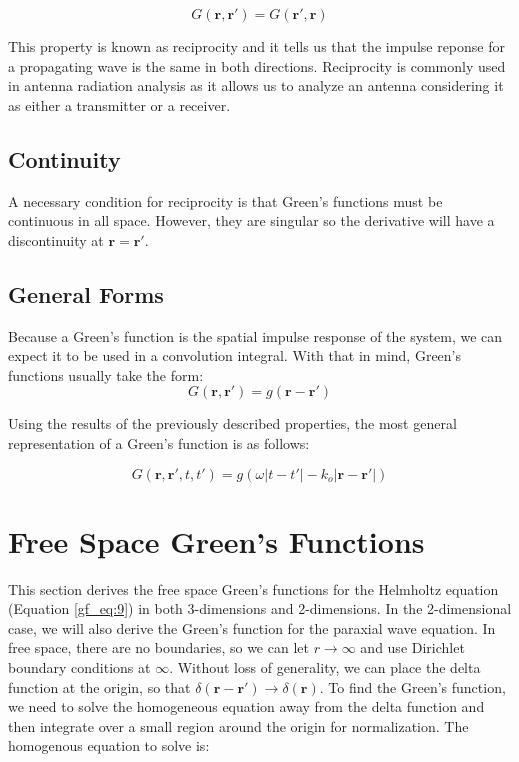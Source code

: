 \begin{equation}
G\left(\mathbf{r},\mathbf{r}' \right) = G\left(\mathbf{r}',\mathbf{r} \right)
\label{gf_eq:18c}
\end{equation}
\renewcommand{\baselinestretch}{2} \small\normalsize

This property is known as reciprocity and it tells us that the impulse reponse for a propagating wave is the same in both directions. Reciprocity is commonly used in antenna radiation analysis as it allows us to analyze an antenna considering it as either a transmitter or a receiver.

\subsection {Continuity} \label{gf_sec:continuity}
A necessary condition for reciprocity is that Green's functions must be continuous in all space. However, they are singular so the derivative will have a discontinuity at $\mathbf{r} = \mathbf{r}'$.

\subsection {General Forms}
Because a Green's function is the spatial impulse response of the system, we can expect it to be used in a convolution integral. With that in mind, Green's functions usually take the form:
\begin{equation}
G\left(\mathbf{r},\mathbf{r}' \right) = g\left( \mathbf{r} - \mathbf{r}'\right)
\label{gf_eq:18d}
\end{equation}
\renewcommand{\baselinestretch}{2} \small\normalsize

Using the results of the previously described properties, the most general representation of a Green's function is as follows:

\begin{equation}
G\left(\mathbf{r},\mathbf{r}',t ,t'\right) = g\left(\omega |t-t'| - k_o| \mathbf{r} - \mathbf{r}' | \right)
\label{gf_eq:19b}
\end{equation}
\renewcommand{\baselinestretch}{2} \small\normalsize

\section {Free Space Green's Functions}
This section derives the free space Green's functions for the Helmholtz equation (Equation \ref{gf_eq:9}) in both 3-dimensions and 2-dimensions. In the 2-dimensional case, we will also derive the Green's function for the paraxial wave equation. In free space, there are no boundaries, so we can let $r\rightarrow \infty$ and use Dirichlet boundary conditions at $\infty$. Without loss of generality, we can place the delta function at the origin, so that $\delta\left(\mathbf{r}-\mathbf{r}' \right) \rightarrow \delta \left(\mathbf{r} \right)$. To find the Green's function, we need to solve the homogeneous equation away from the delta function and then integrate over a small region around the origin for normalization. The homogenous equation to solve is:

